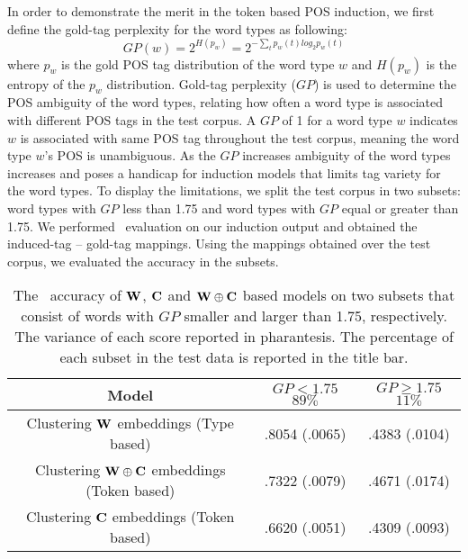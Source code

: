 In order to demonstrate the merit in the token based POS induction, we
first define the gold-tag perplexity for the word types as following:
\begin{equation} \label{eq:tag-perp}
GP(w) = 2^{H(p_w)} = 2^{-\sum_{t} p_w(t)log_2 p_w(t)}
\end{equation}
\noindent where $p_w$ is the gold POS tag distribution of the word
type $w$ and $H(p_w)$ is the entropy of the $p_w$ distribution.
Gold-tag perplexity ($GP$) is used to determine the POS ambiguity of
the word types, relating how often a word type is associated with
different POS tags in the test corpus.  A $GP$ of 1 for a word type
$w$ indicates $w$ is associated with same POS tag throughout the test
corpus, meaning the word type $w$'s POS is unambiguous.  As the $GP$
increases ambiguity of the word types increases and poses a handicap
for induction models that limits tag variety for the word types.  To
display the limitations, we split the test corpus in two subsets: word
types with $GP$ less than 1.75 and word types with $GP$ equal or
greater than 1.75.  We performed \mto\ evaluation on our induction
output and obtained the induced-tag -- gold-tag mappings. Using the
mappings obtained over the test corpus, we evaluated the accuracy in
the subsets. 
\begin{table}[h]
\centering
\caption{The \mto\ accuracy of ${\bf W}$, ${\bf C}$ and ${\bf W}\oplus{\bf C}$ based
  models on two subsets that consist of words with $GP$ smaller and
  larger than 1.75, respectively.  The variance of each score reported in 
  pharantesis.  The percentage of each subset in the
  test data is reported in the title bar.
}
\begin{tabular}{|c|c|c|}
  \hline
  Model & \specialcell{$GP < 1.75$\\$89\%$} & \specialcell{$GP \ge 1.75$\\$11\%$}\\
  \hline
  \specialcell{Clustering ${\bf W}$ embeddings\\(Type based)} & .8054 (.0065) & .4383 (.0104)\\
  \hline
  \specialcell{Clustering ${\bf W} \oplus {\bf C}$ embeddings\\(Token based)}& .7322 (.0079) & .4671 (.0174)\\
  \hline
  \specialcell{Clustering ${\bf C}$ embeddings\\(Token based)} & .6620 (.0051) & .4309 (.0093)\\
  \hline  
\end{tabular}
\label{tab:bins}
\end{table}

